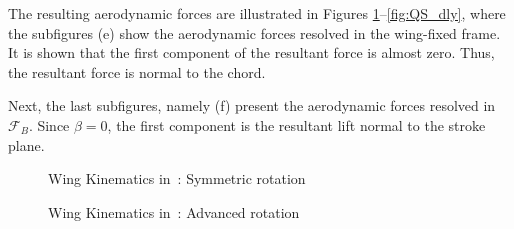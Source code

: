 \documentclass[10pt]{article}
\begin{document}
The resulting aerodynamic forces are illustrated in Figures \ref{fig:QS_sym}--\ref{fig:QS_dly}, where the subfigures (e) show the aerodynamic forces resolved in the wing-fixed frame. 
It is shown that the first component of the resultant force is almost zero. 
Thus, the resultant force is normal to the chord. 

Next, the last subfigures, namely (f) present the aerodynamic forces resolved in $\mathcal{F}_B$. 
Since $\beta=0$, the first component is the resultant lift normal to the stroke plane. 


\begin{figure}[p]
    \centerline{
        \hfill
    }
    \centerline{
        \hfill
    }
    \centerline{
        \hfill
    }
    \caption{Wing Kinematics in~\cite{berman2007energy}: Symmetric rotation}\label{fig:QS_sym}
\end{figure}

\begin{figure}[p]
    \centerline{
        \hfill
    }
    \centerline{
        \hfill
    }
    \centerline{
        \hfill
    }
    \caption{Wing Kinematics in~\cite{berman2007energy}: Advanced rotation}\label{fig:QS_adv}
\end{figure}
\end{document}
